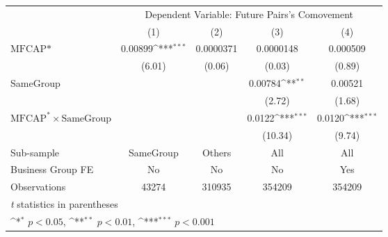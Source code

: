 {
\def\sym#1{\ifmmode^{#1}\else\(^{#1}\)\fi}
\begin{tabular}{l*{4}{c}}
\hline\hline
                &\multicolumn{4}{c}{Dependent Variable:  Future Pairs's Comovement}         \\\cmidrule(lr){2-5}
                &\multicolumn{1}{c}{(1)}         &\multicolumn{1}{c}{(2)}         &\multicolumn{1}{c}{(3)}         &\multicolumn{1}{c}{(4)}         \\
\hline
$ \text{MFCAP*} $&  0.00899\sym{***}&0.0000371         &0.0000148         & 0.000509         \\
                &   (6.01)         &   (0.06)         &   (0.03)         &   (0.89)         \\
[1em]
SameGroup       &                  &                  &  0.00784\sym{**} &  0.00521         \\
                &                  &                  &   (2.72)         &   (1.68)         \\
[1em]
 $ \text{MFCAP}^* \times {\text{SameGroup} }  $ &                  &                  &   0.0122\sym{***}&   0.0120\sym{***}\\
                &                  &                  &  (10.34)         &   (9.74)         \\
\hline
Sub-sample      &SameGroup         &   Others         &      All         &      All         \\
Business Group FE&       No         &       No         &       No         &      Yes         \\
Observations    &    43274         &   310935         &   354209         &   354209         \\
\hline\hline
\multicolumn{5}{l}{\footnotesize \textit{t} statistics in parentheses}\\
\multicolumn{5}{l}{\footnotesize \sym{*} \(p<0.05\), \sym{**} \(p<0.01\), \sym{***} \(p<0.001\)}\\
\end{tabular}
}
